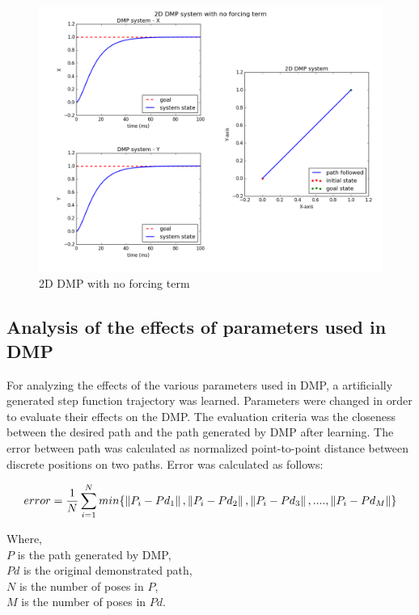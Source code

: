 \begin{figure}[H]
	\includegraphics[width=\textwidth]{images/dmp_no_f.png}
	\caption{2D DMP with no forcing term}
	\label{fig:DMP_2DOF}
\end{figure}


\newpage

\subsection{Analysis of the effects of parameters used in DMP}

For analyzing the effects of the various parameters used in DMP, a artificially generated step function trajectory was learned. Parameters were changed in order to evaluate their effects on the DMP. The evaluation criteria was the closeness between the desired path and the path generated by DMP after learning. The error between path was calculated as normalized point-to-point distance between discrete positions on two paths. Error was calculated as follows:

\begin{equation}
	error = \frac{1}{N}\sum_{i = 1}^{N}min\{\left\lVert P_{i} - Pd_{1}\right\rVert, \left\lVert P_{i} - Pd_{2}\right\rVert, \left\lVert P_{i} - Pd_{3}\right\rVert, .... , \left\lVert P_{i} - Pd_{M}\right\rVert\}
\end{equation}

Where,\\
$P$ is the path generated by DMP, \\
$Pd$ is the original demonstrated path, \\
$N$ is the number of poses in $P$, \\
$M$ is the number of poses in $Pd$.


